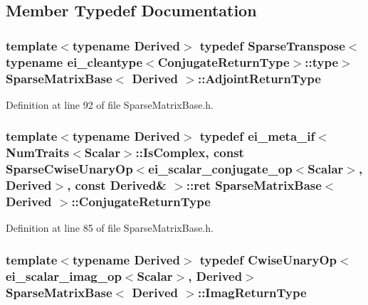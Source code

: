 \subsection{Member Typedef Documentation}
\hypertarget{class_sparse_matrix_base_af76ed9177bd4fb93e1e60e683ec5b0b7}{
\subsubsection[{Adjoint\-Return\-Type}]{\setlength{\rightskip}{0pt plus 5cm}template$<$typename Derived$>$ typedef {\bf Sparse\-Transpose}$<$typename {\bf ei\-\_\-cleantype}$<${\bf Conjugate\-Return\-Type}$>$\-::{\bf type}$>$ {\bf Sparse\-Matrix\-Base}$<$ Derived $>$\-::{\bf Adjoint\-Return\-Type}}}\label{class_sparse_matrix_base_af76ed9177bd4fb93e1e60e683ec5b0b7}


Definition at line 92 of file Sparse\-Matrix\-Base.\-h.

\hypertarget{class_sparse_matrix_base_a27b8ae47093df848658ec84ca2ccfb2f}{
\subsubsection[{Conjugate\-Return\-Type}]{\setlength{\rightskip}{0pt plus 5cm}template$<$typename Derived$>$ typedef {\bf ei\-\_\-meta\-\_\-if}$<${\bf Num\-Traits}$<${\bf Scalar}$>$\-::Is\-Complex, const {\bf Sparse\-Cwise\-Unary\-Op}$<${\bf ei\-\_\-scalar\-\_\-conjugate\-\_\-op}$<${\bf Scalar}$>$, Derived$>$, const Derived\& $>$\-::{\bf ret} {\bf Sparse\-Matrix\-Base}$<$ Derived $>$\-::{\bf Conjugate\-Return\-Type}}}\label{class_sparse_matrix_base_a27b8ae47093df848658ec84ca2ccfb2f}


Definition at line 85 of file Sparse\-Matrix\-Base.\-h.

\hypertarget{class_sparse_matrix_base_a9f0f4399edce5ebf59ebaaa09c599e97}{
\subsubsection[{Imag\-Return\-Type}]{\setlength{\rightskip}{0pt plus 5cm}template$<$typename Derived$>$ typedef {\bf Cwise\-Unary\-Op}$<${\bf ei\-\_\-scalar\-\_\-imag\-\_\-op}$<${\bf Scalar}$>$, Derived$>$ {\bf Sparse\-Matrix\-Base}$<$ Derived $>$\-::{\bf Imag\-Return\-Type}}}\label{class_sparse_matrix_base_a9f0f4399edce5ebf59ebaaa09c599e97}


